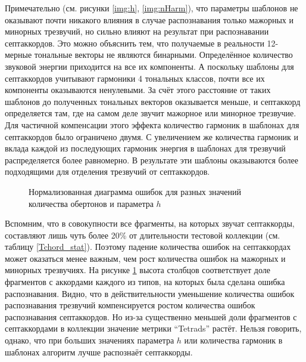 Примечательно (см. рисунки \ref{img:h}, \ref{img:nHarm}), что параметры шаблонов
не оказывают почти никакого влияния в случае распознавания только мажорных и
минорных трезвучий, но сильно влияют на результат при распознавании
септаккордов. Это можно объяснить тем, что получаемые в реальности 12-мерные
тональные векторы не являются бинарными. Определённое количество звуковой
энергии приходится на все их компоненты. А поскольку шаблоны для септаккордов
учитывают гармоники 4 тональных классов, почти все их компоненты оказываются
ненулевыми. За счёт этого расстояние от таких шаблонов до полученных тональных
векторов оказывается меньше, и септаккорд определяется там, где на самом деле
звучит мажорное или минорное трезвучие. Для частичной компенсации этого эффекта
количество гармоник в шаблонах для септаккордов было ограничено двумя. С
увеличением же количества гармоник и вклада каждой из последующих гармоник
энергия в шаблонах для трезвучий распределяется более равномерно. В результате
эти шаблоны оказываются более подходящими для отделения трезвучий от
септаккордов.

\begin{figure}[h]
  \begin{minipage}[h]{0.49\linewidth}
  \end{minipage}
  \hfill
  \begin{minipage}[h]{0.49\linewidth}
  \end{minipage}
  \caption{Нормализованная диаграмма ошибок для разных значений количества
  обертонов и параметра $h$}
  \label{img:nHarmh_n}
\end{figure}

Вспомним, что в совокупности все фрагменты, на которых звучат септаккорды,
составляют лишь чуть более 20\% от длительности тестовой коллекции (см. таблицу
\ref{Tchord_stat}). Поэтому падение количества ошибок на септаккордах может
оказаться менее важным, чем рост количества ошибок на мажорных и минорных
трезвучиях. На рисунке \ref{img:nHarmh_n} высота столбцов соответствует доле
фрагментов с аккордами каждого из типов, на которых была сделана ошибка
распознавания. Видно, что в действительности уменьшение количества ошибок
распознавания трезвучий компенсируется ростом количества ошибок распознавания
септаккордов. Но из-за существенно меньшей доли фрагментов с септаккордами в
коллекции значение метрики ``Tetrads'' растёт. Нельзя говорить, однако, что при
больших значениях параметра $h$ или количества гармоник в шаблонах алгоритм
лучше распознаёт септаккорды.

